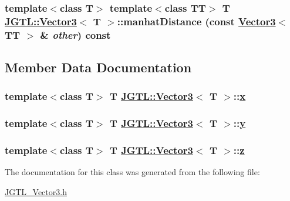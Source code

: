 \hypertarget{class_j_g_t_l_1_1_vector3_191a2b4b58ac8d590ccc688d2bd1c71d}{
\subsubsection[manhatDistance]{\setlength{\rightskip}{0pt plus 5cm}template$<$class T$>$ template$<$class TT$>$ T \hyperlink{class_j_g_t_l_1_1_vector3}{JGTL::Vector3}$<$ T $>$::manhat\-Distance (const \hyperlink{class_j_g_t_l_1_1_vector3}{Vector3}$<$ TT $>$ \& {\em other}) const}}
\label{class_j_g_t_l_1_1_vector3_191a2b4b58ac8d590ccc688d2bd1c71d}




\subsection{Member Data Documentation}
\hypertarget{class_j_g_t_l_1_1_vector3_088995b000b415dc8a66ef540212619c}{
\subsubsection[x]{\setlength{\rightskip}{0pt plus 5cm}template$<$class T$>$ T \hyperlink{class_j_g_t_l_1_1_vector3}{JGTL::Vector3}$<$ T $>$::\hyperlink{class_j_g_t_l_1_1_vector3_088995b000b415dc8a66ef540212619c}{x}}}
\label{class_j_g_t_l_1_1_vector3_088995b000b415dc8a66ef540212619c}


\hypertarget{class_j_g_t_l_1_1_vector3_9f621df88811d2765b8bc6dba68be9cd}{
\subsubsection[y]{\setlength{\rightskip}{0pt plus 5cm}template$<$class T$>$ T \hyperlink{class_j_g_t_l_1_1_vector3}{JGTL::Vector3}$<$ T $>$::\hyperlink{class_j_g_t_l_1_1_vector3_9f621df88811d2765b8bc6dba68be9cd}{y}}}
\label{class_j_g_t_l_1_1_vector3_9f621df88811d2765b8bc6dba68be9cd}


\hypertarget{class_j_g_t_l_1_1_vector3_8a58fe341555219f99448e6b03e592c2}{
\subsubsection[z]{\setlength{\rightskip}{0pt plus 5cm}template$<$class T$>$ T \hyperlink{class_j_g_t_l_1_1_vector3}{JGTL::Vector3}$<$ T $>$::\hyperlink{class_j_g_t_l_1_1_vector3_8a58fe341555219f99448e6b03e592c2}{z}}}
\label{class_j_g_t_l_1_1_vector3_8a58fe341555219f99448e6b03e592c2}




The documentation for this class was generated from the following file:\begin{CompactItemize}
\item 
\hyperlink{_j_g_t_l___vector3_8h}{JGTL\_\-Vector3.h}\end{CompactItemize}
